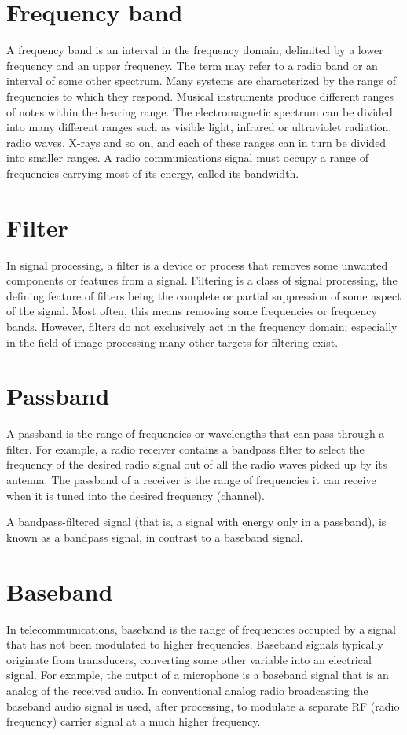 \documentclass[journal,compsoc]{IEEEtran}
\begin{document}
\section{Frequency band}
A frequency band is an interval in the frequency domain, delimited by a lower frequency and an upper frequency. The term may refer to a radio band or an interval of some other spectrum.
Many systems are characterized by the range of frequencies to which they respond. Musical instruments produce different ranges of notes within the hearing range. The electromagnetic spectrum can be divided into many different ranges such as visible light, infrared or ultraviolet radiation, radio waves, X-rays and so on, and each of these ranges can in turn be divided into smaller ranges. A radio communications signal must occupy a range of frequencies carrying most of its energy, called its bandwidth.

\section{Filter}
In signal processing, a filter is a device or process that removes some unwanted components or features from a signal. Filtering is a class of signal processing, the defining feature of filters being the complete or partial suppression of some aspect of the signal. Most often, this means removing some frequencies or frequency bands. However, filters do not exclusively act in the frequency domain; especially in the field of image processing many other targets for filtering exist.

\section{Passband}
A passband is the range of frequencies or wavelengths that can pass through a filter. For example, a radio receiver contains a bandpass filter to select the frequency of the desired radio signal out of all the radio waves picked up by its antenna. The passband of a receiver is the range of frequencies it can receive when it is tuned into the desired frequency (channel).

A bandpass-filtered signal (that is, a signal with energy only in a passband), is known as a bandpass signal, in contrast to a baseband signal.

\section{Baseband}
In telecommunications, baseband is the range of frequencies occupied by a signal that has not been modulated to higher frequencies. Baseband signals typically originate from transducers, converting some other variable into an electrical signal. For example, the output of a microphone is a baseband signal that is an analog of the received audio. In conventional analog radio broadcasting the baseband audio signal is used, after processing, to modulate a separate RF (radio frequency) carrier signal at a much higher frequency.
\end{document}
